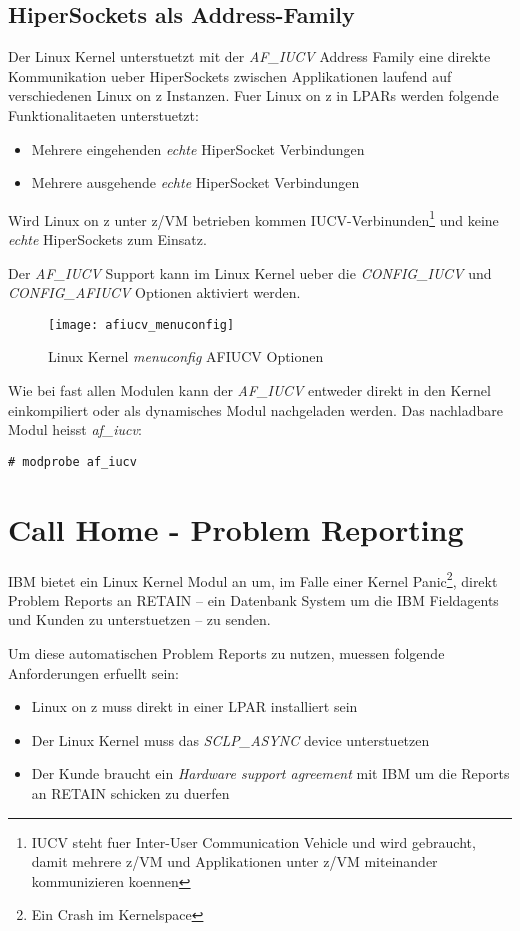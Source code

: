 \subsection{HiperSockets als Address-Family}

Der Linux Kernel unterstuetzt mit der \textit{AF\_IUCV} Address Family eine direkte Kommunikation ueber HiperSockets zwischen Applikationen laufend auf verschiedenen Linux on z Instanzen.
Fuer Linux on z in LPARs werden folgende Funktionalitaeten unterstuetzt:
\begin{itemize}
    \item{Mehrere eingehenden \textit{echte} HiperSocket Verbindungen}
    \item{Mehrere ausgehende \textit{echte} HiperSocket Verbindungen}
\end{itemize}
Wird Linux on z unter z/VM betrieben kommen IUCV-Verbinunden\footnote{IUCV steht fuer Inter-User Communication Vehicle und wird gebraucht, damit mehrere z/VM und Applikationen unter z/VM miteinander kommunizieren koennen} und keine \textit{echte} HiperSockets zum Einsatz.

Der \textit{AF\_IUCV} Support kann im Linux Kernel ueber die \textit{CONFIG\_IUCV} und \textit{CONFIG\_AFIUCV} Optionen aktiviert werden.

\begin{figure}[h!]
\centering
\texttt{[image: afiucv\_menuconfig]}
\caption{Linux Kernel \textit{menuconfig} AF\textunderscore IUCV Optionen}
\label{fig:AFIUCVMENUCONFIG}
\end{figure}

Wie bei fast allen Modulen kann der \textit{AF\_IUCV} entweder direkt in den Kernel einkompiliert oder als dynamisches Modul nachgeladen werden.
Das nachladbare Modul heisst \textit{af\_iucv}:\cite{IBMAFIUCV}

\begin{lstlisting}
# modprobe af_iucv
\end{lstlisting}

\section{Call Home - Problem Reporting}

IBM bietet ein Linux Kernel Modul an um, im Falle einer Kernel Panic\footnote{Ein Crash im Kernelspace}, direkt Problem Reports an RETAIN -- ein Datenbank System um die IBM Fieldagents und Kunden zu unterstuetzen -- zu senden.

Um diese automatischen Problem Reports zu nutzen, muessen folgende Anforderungen erfuellt sein:\cite{IBMCallHome}
\begin{itemize}
    \item{Linux on z muss direkt in einer LPAR installiert sein}
    \item{Der Linux Kernel muss das \textit{SCLP\_ASYNC} device unterstuetzen}
    \item{Der Kunde braucht ein \textit{Hardware support agreement} mit IBM um die Reports an RETAIN schicken zu duerfen}
\end{itemize}

